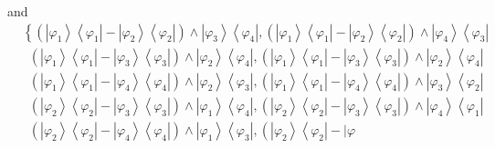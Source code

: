 \documentclass[aps,preprint]{revtex4}%
\begin{document}
and
\begin{align}
&  \left\{  \left(  \left\vert \varphi_{1}\right\rangle \left\langle
\varphi_{1}\right\vert -\left\vert \varphi_{2}\right\rangle \left\langle
\varphi_{2}\right\vert \right)  \wedge\left\vert \varphi_{3}\right\rangle
\left\langle \varphi_{4}\right\vert ,\left(  \left\vert \varphi_{1}%
\right\rangle \left\langle \varphi_{1}\right\vert -\left\vert \varphi
_{2}\right\rangle \left\langle \varphi_{2}\right\vert \right)  \wedge
\left\vert \varphi_{4}\right\rangle \left\langle \varphi_{3}\right\vert
\right.  \nonumber\\
&  \,\,\,\left(  \left\vert \varphi_{1}\right\rangle \left\langle \varphi
_{1}\right\vert -\left\vert \varphi_{3}\right\rangle \left\langle \varphi
_{3}\right\vert \right)  \wedge\left\vert \varphi_{2}\right\rangle
\left\langle \varphi_{4}\right\vert ,\left(  \left\vert \varphi_{1}%
\right\rangle \left\langle \varphi_{1}\right\vert -\left\vert \varphi
_{3}\right\rangle \left\langle \varphi_{3}\right\vert \right)  \wedge
\left\vert \varphi_{2}\right\rangle \left\langle \varphi_{4}\right\vert
\nonumber\\
&  \,\,\,\left(  \left\vert \varphi_{1}\right\rangle \left\langle \varphi
_{1}\right\vert -\left\vert \varphi_{4}\right\rangle \left\langle \varphi
_{4}\right\vert \right)  \wedge\left\vert \varphi_{2}\right\rangle
\left\langle \varphi_{3}\right\vert ,\left(  \left\vert \varphi_{1}%
\right\rangle \left\langle \varphi_{1}\right\vert -\left\vert \varphi
_{4}\right\rangle \left\langle \varphi_{4}\right\vert \right)  \wedge
\left\vert \varphi_{3}\right\rangle \left\langle \varphi_{2}\right\vert
\nonumber\\
&  \,\,\,\left(  \left\vert \varphi_{2}\right\rangle \left\langle \varphi
_{2}\right\vert -\left\vert \varphi_{3}\right\rangle \left\langle \varphi
_{3}\right\vert \right)  \wedge\left\vert \varphi_{1}\right\rangle
\left\langle \varphi_{4}\right\vert ,\left(  \left\vert \varphi_{2}%
\right\rangle \left\langle \varphi_{2}\right\vert -\left\vert \varphi
_{3}\right\rangle \left\langle \varphi_{3}\right\vert \right)  \wedge
\left\vert \varphi_{4}\right\rangle \left\langle \varphi_{1}\right\vert
\nonumber\\
&  \,\,\,\left(  \left\vert \varphi_{2}\right\rangle \left\langle \varphi
_{2}\right\vert -\left\vert \varphi_{4}\right\rangle \left\langle \varphi
_{4}\right\vert \right)  \wedge\left\vert \varphi_{1}\right\rangle
\left\langle \varphi_{3}\right\vert ,\left(  \left\vert \varphi_{2}%
\right\rangle \left\langle \varphi_{2}\right\vert -\left\vert \varphi

\end{align}
\end{document}
